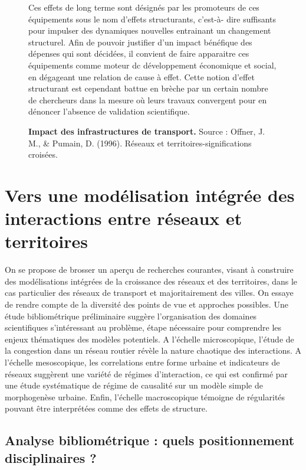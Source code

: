 \begin{figure}[h!]
\begin{mdframed}
Ces effets de long terme sont désignés par les promoteurs de ces équipements sous le nom d’effets structurants, c’est-à-
dire suffisants pour impulser des dynamiques nouvelles entrainant un changement structurel. Afin de pouvoir justifier d’un
impact bénéfique des dépenses qui sont décidées, il convient
de faire apparaitre ces équipements comme moteur dc développement économique et social, en dégageant une relation de cause à effet. Cette notion d’effet structurant est cependant
battue en brèche par un certain nombre de chercheurs dans la
mesure où leurs travaux convergent pour en dénoncer l’absence de validation scientifique.


\end{mdframed}

\caption{\textbf{Impact des infrastructures de transport.} Source : Offner, J. M., \& Pumain, D. (1996). Réseaux et territoires-significations croisées.}
\label{doc:offner-pumain}

\end{figure}




\section{Vers une modélisation intégrée des interactions entre réseaux et territoires}

On se propose de brosser un aperçu de recherches courantes, visant à construire des modélisations intégrées de la croissance des réseaux et des territoires, dans le cas particulier des réseaux de transport et majoritairement des villes. On essaye de rendre compte de la diversité des points de vue et approches possibles. Une étude bibliométrique préliminaire suggère l'organisation des domaines scientifiques s'intéressant au problème, étape nécessaire pour comprendre les enjeux thématiques des modèles potentiels. A l'échelle microscopique, l'étude de la congestion dans un réseau routier révèle la nature chaotique des interactions. A l'échelle mesoscopique, les correlations entre forme urbaine et indicateurs de réseaux suggèrent une variété de régimes d'interaction, ce qui est confirmé par une étude systématique de régime de causalité sur un modèle simple de morphogenèse urbaine. Enfin, l'échelle macroscopique témoigne de régularités pouvant être interprétées comme des effets de structure.


\subsection{Analyse bibliométrique : quels positionnement disciplinaires ?}

